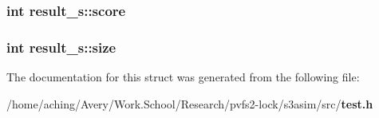 \subsubsection{\setlength{\rightskip}{0pt plus 5cm}int \bf{result\_\-s::score}}\label{structresult__s_7f02017251487a05dad6fab800ca4669}


\subsubsection{\setlength{\rightskip}{0pt plus 5cm}int \bf{result\_\-s::size}}\label{structresult__s_008a1f2ea153301a15245703574846ba}




The documentation for this struct was generated from the following file:\begin{CompactItemize}
\item 
/home/aching/Avery/Work.School/Research/pvfs2-lock/s3asim/src/\bf{test.h}\end{CompactItemize}
